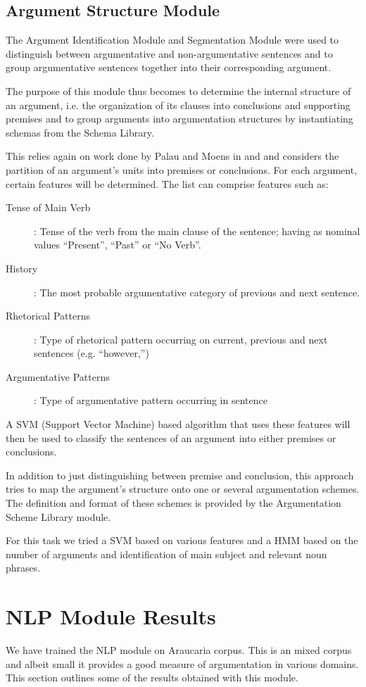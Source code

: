 \subsection{Argument Structure Module}
\par
The Argument Identification Module and Segmentation Module were used to distinguish between argumentative and non-argumentative sentences and to group argumentative sentences together into their corresponding argument.
\par
The purpose of this module thus becomes to determine the internal structure of an argument, i.e. the organization of its clauses into conclusions and supporting premises and to group arguments into argumentation structures by instantiating schemas from the Schema Library.
\par
This relies again on work done by Palau and Moens in \cite{palau1} and \cite{palau2} and considers the partition of an argument's units into premises or conclusions. For each argument, certain features will be determined. The list can comprise features such as:
\begin{description}
\item[Tense of Main Verb]: Tense of the verb from the main clause of the sentence; having as nominal values ``Present'', ``Past'' or ``No Verb''.
\item[History]: The most probable argumentative category of previous and next sentence.
\item[Rhetorical Patterns]: Type of rhetorical pattern occurring on current, previous and next sentences (e.g. ``however,'')
\item[Argumentative Patterns]: Type of argumentative pattern occurring in sentence
\end{description}
A SVM (Support Vector Machine) based algorithm that uses these features will then be used to classify the sentences of an argument into either premises or conclusions.
\par
In addition to just distinguishing between premise and conclusion, this approach tries to map the argument's structure onto one or several argumentation schemes. 
The definition and format of these schemes is provided by the Argumentation Scheme Library module. 
\par
For this task we tried a SVM based on various features and a HMM based on the number of arguments and identification of main subject and relevant noun phrases.

\section{NLP Module Results}
\par
We have trained the NLP module on Araucaria corpus. This is an mixed corpus and albeit small it provides a good measure of argumentation in various domains. This section outlines some of the results obtained with this module.

